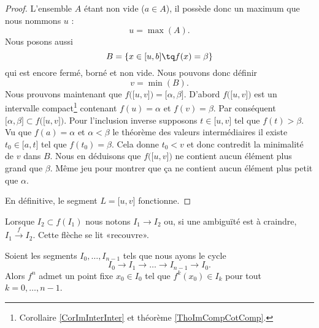 \begin{proof}
    L'ensemble \( A\) étant non vide (\( a\in A\)), il possède donc un maximum que nous nommons \( u\) :
    \begin{equation}
        u=\max(A).
    \end{equation}
    Nous posons aussi
    \begin{equation}
        B=\{ x\in \mathopen[ u , b \mathclose]\tq f(x)=\beta \}
    \end{equation}
    qui est encore fermé, borné et non vide. Nous pouvons donc définir
    \begin{equation}
        v=\min(B).
    \end{equation}
    Nous prouvons maintenant que \( f\big( \mathopen[ u , v \mathclose] \big)=\mathopen[ \alpha , \beta \mathclose]\). D'abord \( f\big( \mathopen[ u , v \mathclose] \big)\) est un intervalle compact\footnote{Corollaire \ref{CorImInterInter} et théorème \ref{ThoImCompCotComp}.} contenant \( f(u)=\alpha\) et \( f(v)=\beta\). Par conséquent \( \mathopen[ \alpha , \beta \mathclose]\subset f\big( \mathopen[ u , v \mathclose] \big)\). Pour l'inclusion inverse supposons \( t\in \mathopen[ u , v \mathclose]\) tel que \( f(t)>\beta\). Vu que \( f(a)=\alpha\) et \( \alpha<\beta\) le théorème des valeurs intermédiaires il existe \( t_0\in \mathopen[ a , t \mathclose]\) tel que \( f(t_0)=\beta\). Cela donne \( t_0<v\) et donc contredit la minimalité de \( v\) dans \( B\). Nous en déduisons que \( f\big( \mathopen[ u , v \mathclose] \big)\) ne contient aucun élément plus grand que \( \beta\). Même jeu pour montrer que ça ne contient aucun élément plus petit que \( \alpha\).

    En définitive, le segment \( L=\mathopen[ u , v \mathclose]\) fonctionne.
\end{proof}

Lorsque \( I_2\subset f(I_1)\) nous notons \( I_1\to I_2\) ou, si une ambiguïté est à craindre, \( I_1\stackrel{f}{\longrightarrow}I_2\). Cette flèche se lit «recouvre».
\begin{lemma}      \label{LemSSPXooMkwzjb}
    Soient les segments \( I_0,\ldots, I_{n-1}\) tels que nous ayons le cycle 
    \begin{equation}
        I_0\to I_1\to\ldots\to I_{n-1}\to I_0.
    \end{equation}
    Alors \( f^n\) admet un point fixe \( x_0\in I_0\) tel que \( f^k(x_0)\in I_k\) pour tout \( k=0,\ldots, n-1\).
\end{lemma}

